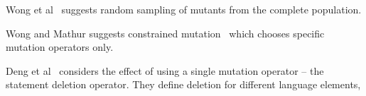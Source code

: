 Wong et al~\cite{wong1994on} suggests random sampling of mutants from the complete population.

Wong and Mathur suggests constrained mutation~\cite{} which chooses specific mutation operators only.

Deng et al~\cite{deng2013empirical} considers the effect of using a single mutation operator -- the statement deletion operator. They define deletion for different language elements,